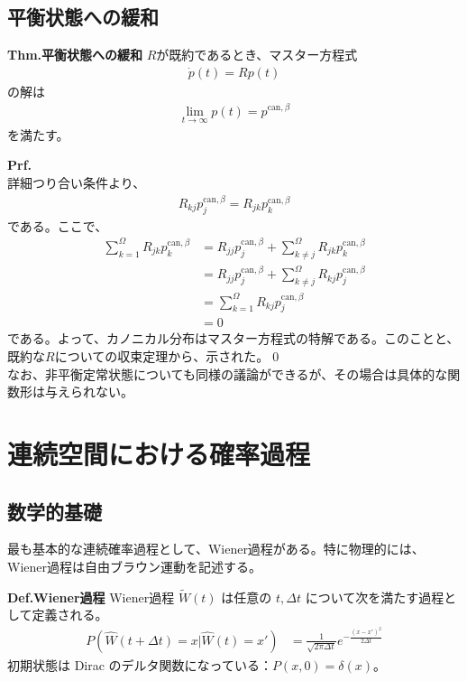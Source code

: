 \documentclass[a4paper,11pt]{jsarticle}
\numberwithin{equation}{section}
\begin{document}
\subsection{平衡状態への緩和}
\begin{itembox}[l]{\textbf{Thm.平衡状態への緩和}}
  $R$が既約であるとき、マスター方程式
  \begin{align}
    \dot{p}(t) = Rp(t)
  \end{align}
  の解は
  \begin{align}
    \lim_{t \to \infty}p(t) = p^{\text{can},\beta}
  \end{align}
  を満たす。
\end{itembox}
\textbf{Prf.}\\
詳細つり合い条件より、
\begin{align}
  R_{kj}p_j^{\text{can},\beta} = R_{jk}p_k^{\text{can},\beta}
\end{align}
である。ここで、
\begin{align}
  \sum_{k=1}^{\Omega}R_{jk} p_k^{\text{can},\beta} &= R_{jj}p_j^{\text{can},\beta} + \sum_{k \neq j}^{\Omega}R_{jk}p_k^{\text{can},\beta}\\
  &= R_{jj}p_j^{\text{can},\beta} + \sum_{k \neq j}^{\Omega}R_{kj}p_j^{\text{can},\beta}\\
  &= \sum_{k=1}^{\Omega}R_{kj}p_j^{\text{can},\beta}\\
  &= 0
\end{align}
である。よって、カノニカル分布はマスター方程式の特解である。このことと、既約な$R$についての収束定理から、示された。\qed\\
なお、非平衡定常状態についても同様の議論ができるが、その場合は具体的な関数形は与えられない。\\

\section{連続空間における確率過程}
\subsection{数学的基礎}
最も基本的な連続確率過程として、Wiener過程がある。特に物理的には、Wiener過程は自由ブラウン運動を記述する。
\begin{itembox}[l]{\textbf{Def.Wiener過程}}
  Wiener過程 $\widetilde{W}(t)$ は任意の $t, \Delta t$ について次を満たす過程として定義される。
\begin{align}
    P(\hat{W}(t + \Delta t) = x | \hat{W}(t) = x') &= \frac{1}{\sqrt{2\pi \Delta t}} e^{-\frac{(x - x')^2}{2\Delta t}}
\end{align}
初期状態は Dirac のデルタ関数になっている：$P(x,0) = \delta(x)$。
\end{itembox}
\end{document}
